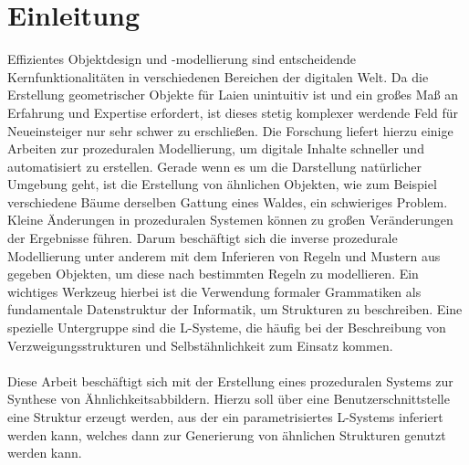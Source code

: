 
\chapter{Einleitung}
Effizientes Objektdesign und -modellierung sind entscheidende Kernfunktionalitäten in verschiedenen Bereichen der
digitalen Welt.
Da die Erstellung geometrischer Objekte für Laien unintuitiv ist und ein großes Maß an Erfahrung und Expertise
erfordert, ist dieses stetig komplexer werdende Feld für Neueinsteiger nur sehr schwer zu erschließen.
Die Forschung liefert hierzu einige Arbeiten zur prozeduralen Modellierung, um digitale Inhalte schneller
und automatisiert zu erstellen.
Gerade wenn es um die Darstellung natürlicher Umgebung geht, ist die Erstellung von ähnlichen Objekten, wie
zum Beispiel verschiedene Bäume derselben Gattung eines Waldes, ein schwieriges Problem.
Kleine Änderungen in prozeduralen Systemen können zu großen Veränderungen der Ergebnisse führen.
Darum beschäftigt sich die inverse prozedurale Modellierung unter anderem mit dem Inferieren von Regeln
und Mustern aus gegeben Objekten, um diese nach bestimmten Regeln zu modellieren.
Ein wichtiges Werkzeug hierbei ist die Verwendung formaler Grammatiken als fundamentale Datenstruktur
der Informatik, um Strukturen zu beschreiben.
Eine spezielle Untergruppe sind die L-Systeme, die häufig bei der Beschreibung
von Verzweigungsstrukturen und Selbstähnlichkeit zum Einsatz kommen.
\\~\\
Diese Arbeit beschäftigt sich mit der Erstellung eines prozeduralen Systems zur Synthese von Ähnlichkeitsabbildern.
Hierzu soll über eine Benutzerschnittstelle eine Struktur erzeugt werden, aus der ein parametrisiertes L-Systems
inferiert werden kann, welches dann zur Generierung von ähnlichen Strukturen genutzt werden kann.

\newpage

